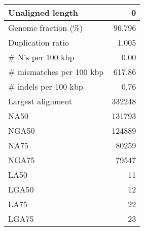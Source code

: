 \documentclass[12pt,a4paper]{article}
\begin{document}
\begin{table}[ht]
\begin{center}
\begin{tabular}{|l*{1}{|r}|}
Unaligned length & 0 \\ \hline
Genome fraction (\%) & 96.796 \\ \hline
Duplication ratio & 1.005 \\ \hline
\# N's per 100 kbp & 0.00 \\ \hline
\# mismatches per 100 kbp & 617.86 \\ \hline
\# indels per 100 kbp & 0.76 \\ \hline
Largest alignment & 332248 \\ \hline
NA50 & 131793 \\ \hline
NGA50 & 124889 \\ \hline
NA75 & 80259 \\ \hline
NGA75 & 79547 \\ \hline
LA50 & 11 \\ \hline
LGA50 & 12 \\ \hline
LA75 & 22 \\ \hline
LGA75 & 23 \\ \hline
\end{tabular}
\end{center}
\end{table}
\end{document}

